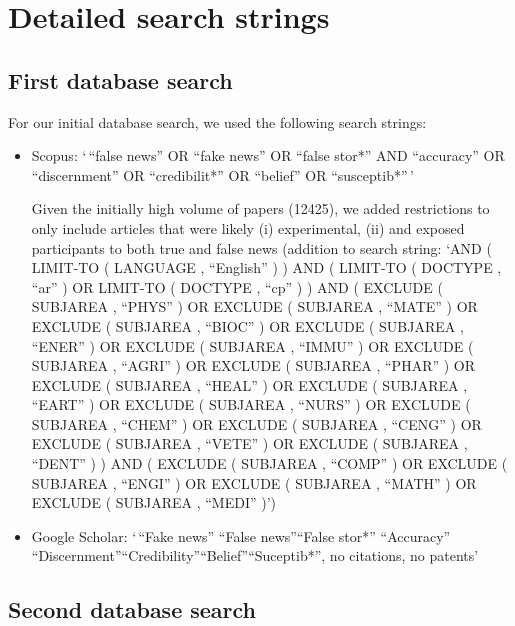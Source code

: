 \documentclass[
  doc,floatsintext]{apa6}
\begin{document}
\clearpage

\section{Detailed search strings}\label{lit-review}

\FloatBarrier

\subsection{First database search}\label{first-database-search}

For our initial database search, we used the following search strings:

\begin{itemize}
\item
  Scopus:
  `\,``false news'' OR ``fake news'' OR ``false stor*'' AND ``accuracy'' OR ``discernment'' OR ``credibilit*'' OR ``belief'' OR ``susceptib*''\,'

  Given the initially high volume of papers (12425), we added restrictions to only include articles that were likely (i) experimental, (ii) and exposed participants to both true and false news (addition to search string: `AND ( LIMIT-TO ( LANGUAGE , ``English'' ) ) AND ( LIMIT-TO ( DOCTYPE , ``ar'' ) OR LIMIT-TO ( DOCTYPE , ``cp'' ) ) AND ( EXCLUDE ( SUBJAREA , ``PHYS'' ) OR EXCLUDE ( SUBJAREA , ``MATE'' ) OR EXCLUDE ( SUBJAREA , ``BIOC'' ) OR EXCLUDE ( SUBJAREA , ``ENER'' ) OR EXCLUDE ( SUBJAREA , ``IMMU'' ) OR EXCLUDE ( SUBJAREA , ``AGRI'' ) OR EXCLUDE ( SUBJAREA , ``PHAR'' ) OR EXCLUDE ( SUBJAREA , ``HEAL'' ) OR EXCLUDE ( SUBJAREA , ``EART'' ) OR EXCLUDE ( SUBJAREA , ``NURS'' ) OR EXCLUDE ( SUBJAREA , ``CHEM'' ) OR EXCLUDE ( SUBJAREA , ``CENG'' ) OR EXCLUDE ( SUBJAREA , ``VETE'' ) OR EXCLUDE ( SUBJAREA , ``DENT'' ) ) AND ( EXCLUDE ( SUBJAREA , ``COMP'' ) OR EXCLUDE ( SUBJAREA , ``ENGI'' ) OR EXCLUDE ( SUBJAREA , ``MATH'' ) OR EXCLUDE ( SUBJAREA , ``MEDI'' )')
\item
  Google Scholar: `\,``Fake news'' \textbar{} ``False news''\textbar{}``False stor*'' ``Accuracy'' \textbar{} ``Discernment''\textbar{}``Credibility''\textbar{}``Belief''\textbar{}``Suceptib*'', no citations, no patents'
\end{itemize}

\subsection{Second database search}\label{second-database-search}
\end{document}
